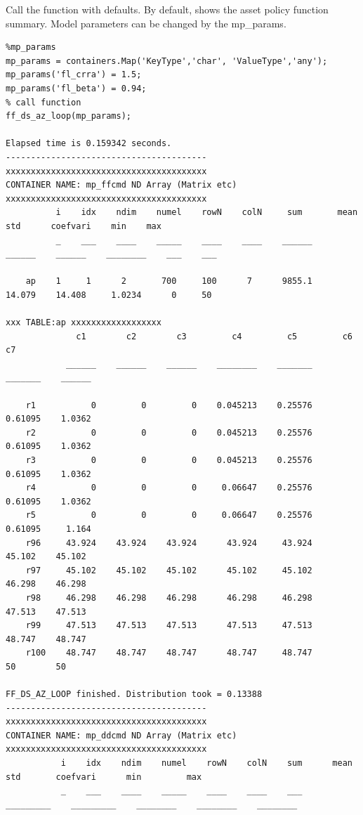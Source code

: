 \documentclass[
]{book}
\begin{document}
Call the function with defaults. By default, shows the asset policy
function summary. Model parameters can be changed by the mp\_params.

\begin{verbatim}
%mp_params
mp_params = containers.Map('KeyType','char', 'ValueType','any');
mp_params('fl_crra') = 1.5;
mp_params('fl_beta') = 0.94;
% call function
ff_ds_az_loop(mp_params);

Elapsed time is 0.159342 seconds.
----------------------------------------
xxxxxxxxxxxxxxxxxxxxxxxxxxxxxxxxxxxxxxxx
CONTAINER NAME: mp_ffcmd ND Array (Matrix etc)
xxxxxxxxxxxxxxxxxxxxxxxxxxxxxxxxxxxxxxxx
          i    idx    ndim    numel    rowN    colN     sum       mean      std      coefvari    min    max
          _    ___    ____    _____    ____    ____    ______    ______    ______    ________    ___    ___

    ap    1     1      2       700     100      7      9855.1    14.079    14.408     1.0234      0     50 

xxx TABLE:ap xxxxxxxxxxxxxxxxxx
              c1        c2        c3         c4         c5         c6         c7  
            ______    ______    ______    ________    _______    _______    ______

    r1           0         0         0    0.045213    0.25576    0.61095    1.0362
    r2           0         0         0    0.045213    0.25576    0.61095    1.0362
    r3           0         0         0    0.045213    0.25576    0.61095    1.0362
    r4           0         0         0     0.06647    0.25576    0.61095    1.0362
    r5           0         0         0     0.06647    0.25576    0.61095     1.164
    r96     43.924    43.924    43.924      43.924     43.924     45.102    45.102
    r97     45.102    45.102    45.102      45.102     45.102     46.298    46.298
    r98     46.298    46.298    46.298      46.298     46.298     47.513    47.513
    r99     47.513    47.513    47.513      47.513     47.513     48.747    48.747
    r100    48.747    48.747    48.747      48.747     48.747         50        50

FF_DS_AZ_LOOP finished. Distribution took = 0.13388
----------------------------------------
xxxxxxxxxxxxxxxxxxxxxxxxxxxxxxxxxxxxxxxx
CONTAINER NAME: mp_ddcmd ND Array (Matrix etc)
xxxxxxxxxxxxxxxxxxxxxxxxxxxxxxxxxxxxxxxx
           i    idx    ndim    numel    rowN    colN    sum      mean          std       coefvari      min         max   
           _    ___    ____    _____    ____    ____    ___    _________    _________    ________    ________    ________


\end{verbatim}
\end{document}
